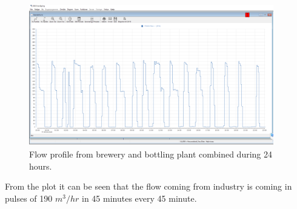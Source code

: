 \begin{figure}[H]
	\centering
	\includegraphics[width=0.95\textwidth]{report/system_overview/pictures/flow_profile_industry}
	\caption{Flow profile from brewery and bottling plant combined during 24 hours.}
	\label{fig:flow_profile_industry}
\end{figure}	

From the plot it can be seen that the flow coming from industry is coming in pulses of 190 $m^3/hr$ in 45 minutes every 45 minute.  

